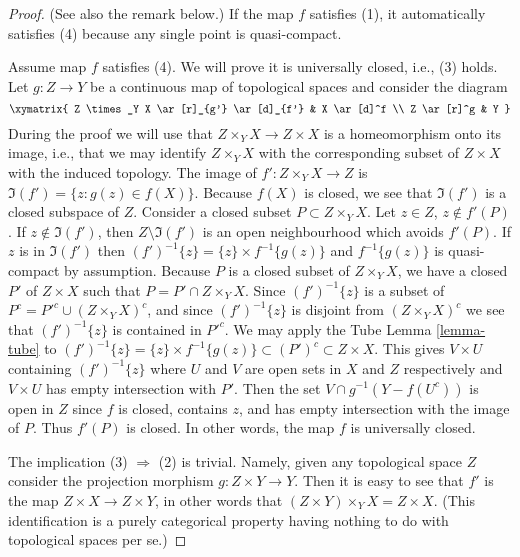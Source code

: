 \begin{proof}
(See also the remark below.)
If the map $f$ satisfies (1), it automatically satisfies (4) because
any single point is quasi-compact.

\medskip\noindent
Assume map $f$ satisfies (4).
We  will prove it is universally closed, i.e., (3) holds.
Let $g : Z \to Y$ be a continuous map of topological spaces
and consider the diagram
$$
\xymatrix{
Z \times_Y X \ar[r]_{g'} \ar[d]_{f'} & X \ar[d]^f \\
Z \ar[r]^g & Y
}
$$
During the proof we will use that $Z \times_Y X \to Z \times X$
is a homeomorphism onto its image, i.e., that we may identify
$Z \times_Y X$ with the corresponding subset of $Z \times X$ with
the induced topology.
The image of $f' : Z \times_Y X \to Z$ is
$\Im(f') = \{z : g(z) \in f(X)\}$.
Because $f(X)$ is closed, we see that
$\Im(f')$ is a closed subspace of $Z$.
Consider a closed subset $P \subset Z \times_Y X$.
Let $z \in Z$, $z \not \in f'(P)$.
If $z \not \in \Im(f')$, then $Z \setminus \Im(f')$
is an open neighbourhood which avoids $f'(P)$.
If $z$ is in $\Im(f')$
then $(f')^{-1}\{z\} = \{z\} \times f^{-1}\{g(z)\}$
and $f^{-1}\{g(z)\}$
is quasi-compact by assumption. Because $P$ is a closed
subset of $Z \times_Y X$, we have a closed $P'$ of $Z \times X$ such
that $P = P' \cap Z \times_Y X$.
Since $(f')^{-1}\{z\}$ is a subset of $P^c = P'^c \cup (Z \times_Y X)^c$,
and since $(f')^{-1}\{z\}$ is disjoint from $(Z \times_Y X)^c$
we see that $(f')^{-1}\{z\}$ is contained in $P'^c$.
We may apply the Tube Lemma \ref{lemma-tube} to
$(f')^{-1}\{z\} = \{z\} \times f^{-1}\{g(z)\}
\subset (P')^c \subset Z \times X$.
This gives $V \times U$ containing
$(f')^{-1}\{z\}$ where $U$ and $V$ are open sets in $X$ and $Z$
respectively and $V \times U$ has empty intersection with $P'$.
Then the set $V \cap g^{-1}(Y-f(U^c))$ is open in $Z$ since $f$
is closed, contains $z$, and has empty intersection with the image of $P$.
Thus $f'(P)$ is closed. In other words, the map $f$ is universally closed.

\medskip\noindent
The implication (3) $\Rightarrow$ (2) is trivial.
Namely, given any topological space $Z$ consider the projection
morphism $g : Z \times Y \to Y$. Then it is easy to see
that $f'$ is the map $Z \times X \to Z \times Y$, in other
words that $(Z \times Y) \times_Y X = Z \times X$. (This identification
is a purely categorical property having nothing to do with
topological spaces per se.)


\end{proof}
